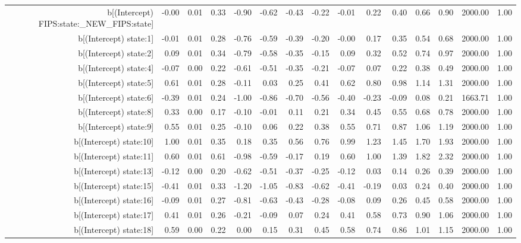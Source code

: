 \begin{table}[ht]
\begin{tabular}{rrrrrrrrrrrrrrr}
  b[(Intercept) FIPS:state:\_NEW\_FIPS:state] & -0.00 & 0.01 & 0.33 & -0.90 & -0.62 & -0.43 & -0.22 & -0.01 & 0.22 & 0.40 & 0.66 & 0.90 & 2000.00 & 1.00 \\ 
  b[(Intercept) state:1] & -0.01 & 0.01 & 0.28 & -0.76 & -0.59 & -0.39 & -0.20 & -0.00 & 0.17 & 0.35 & 0.54 & 0.68 & 2000.00 & 1.00 \\ 
  b[(Intercept) state:2] & 0.09 & 0.01 & 0.34 & -0.79 & -0.58 & -0.35 & -0.15 & 0.09 & 0.32 & 0.52 & 0.74 & 0.97 & 2000.00 & 1.00 \\ 
  b[(Intercept) state:4] & -0.07 & 0.00 & 0.22 & -0.61 & -0.51 & -0.35 & -0.21 & -0.07 & 0.07 & 0.22 & 0.38 & 0.49 & 2000.00 & 1.00 \\ 
  b[(Intercept) state:5] & 0.61 & 0.01 & 0.28 & -0.11 & 0.03 & 0.25 & 0.41 & 0.62 & 0.80 & 0.98 & 1.14 & 1.31 & 2000.00 & 1.00 \\ 
  b[(Intercept) state:6] & -0.39 & 0.01 & 0.24 & -1.00 & -0.86 & -0.70 & -0.56 & -0.40 & -0.23 & -0.09 & 0.08 & 0.21 & 1663.71 & 1.00 \\ 
  b[(Intercept) state:8] & 0.33 & 0.00 & 0.17 & -0.10 & -0.01 & 0.11 & 0.21 & 0.34 & 0.45 & 0.55 & 0.68 & 0.78 & 2000.00 & 1.00 \\ 
  b[(Intercept) state:9] & 0.55 & 0.01 & 0.25 & -0.10 & 0.06 & 0.22 & 0.38 & 0.55 & 0.71 & 0.87 & 1.06 & 1.19 & 2000.00 & 1.00 \\ 
  b[(Intercept) state:10] & 1.00 & 0.01 & 0.35 & 0.18 & 0.35 & 0.56 & 0.76 & 0.99 & 1.23 & 1.45 & 1.70 & 1.93 & 2000.00 & 1.00 \\ 
  b[(Intercept) state:11] & 0.60 & 0.01 & 0.61 & -0.98 & -0.59 & -0.17 & 0.19 & 0.60 & 1.00 & 1.39 & 1.82 & 2.32 & 2000.00 & 1.00 \\ 
  b[(Intercept) state:13] & -0.12 & 0.00 & 0.20 & -0.62 & -0.51 & -0.37 & -0.25 & -0.12 & 0.03 & 0.14 & 0.26 & 0.39 & 2000.00 & 1.00 \\ 
  b[(Intercept) state:15] & -0.41 & 0.01 & 0.33 & -1.20 & -1.05 & -0.83 & -0.62 & -0.41 & -0.19 & 0.03 & 0.24 & 0.40 & 2000.00 & 1.00 \\ 
  b[(Intercept) state:16] & -0.09 & 0.01 & 0.27 & -0.81 & -0.63 & -0.43 & -0.28 & -0.08 & 0.09 & 0.26 & 0.45 & 0.58 & 2000.00 & 1.00 \\ 
  b[(Intercept) state:17] & 0.41 & 0.01 & 0.26 & -0.21 & -0.09 & 0.07 & 0.24 & 0.41 & 0.58 & 0.73 & 0.90 & 1.06 & 2000.00 & 1.00 \\ 
  b[(Intercept) state:18] & 0.59 & 0.00 & 0.22 & 0.00 & 0.15 & 0.31 & 0.45 & 0.58 & 0.74 & 0.86 & 1.01 & 1.15 & 2000.00 & 1.00 \\ 

\end{tabular}
\end{table}
